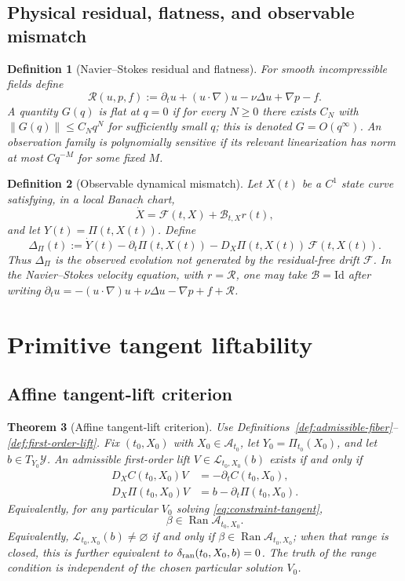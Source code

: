\documentclass[12pt]{article}
\newtheorem{theorem}{Theorem}[section]
\newtheorem{definition}[theorem]{Definition}
\newcommand{\A}{\mathcal A}
\newcommand{\Y}{\mathcal Y}
\newcommand{\Rres}{\mathcal R}
\newcommand{\Ran}{\operatorname{Ran}}
\newcommand{\Id}{\mathrm{Id}}
\newcommand{\Comp}{\mathscr A}
\begin{document}
\subsection{Physical residual, flatness, and observable mismatch}
\begin{definition}[Navier--Stokes residual and flatness]\label{def:residual-flatness}
For smooth incompressible fields define
\[
\Rres(u,p,f)
:=\partial_tu+(u\cdot\nabla)u-\nu\Delta u+\nabla p-f.
\]
A quantity $G(q)$ is \emph{flat at $q=0$} if for every $N\ge0$ there exists $C_N$ with $\|G(q)\|\le C_Nq^N$ for sufficiently small $q$; this is denoted $G=O(q^\infty)$. An observation family is \emph{polynomially sensitive} if its relevant linearization has norm at most $Cq^{-M}$ for some fixed $M$.
\end{definition}

\begin{definition}[Observable dynamical mismatch]\label{def:dyn-mismatch}
Let $X(t)$ be a $C^1$ state curve satisfying, in a local Banach chart,
\[
\dot X=\mathcal F(t,X)+\mathcal B_{t,X}r(t),
\]
and let $Y(t)=\Pi(t,X(t))$. Define
\[
\Delta_\Pi(t)
:=\dot Y(t)-\partial_t\Pi(t,X(t))-D_X\Pi(t,X(t))\,\mathcal F(t,X(t)).
\]
Thus $\Delta_\Pi$ is the observed evolution not generated by the residual-free drift $\mathcal F$. In the Navier--Stokes velocity equation, with $r=\Rres$, one may take $\mathcal B=\Id$ after writing $\partial_tu=-(u\cdot\nabla)u+\nu\Delta u-\nabla p+f+\Rres$.
\end{definition}

\section{Primitive tangent liftability}
\subsection{Affine tangent-lift criterion}
\begin{theorem}[Affine tangent-lift criterion]\label{thm:tangentlift}
Use Definitions~\ref{def:admissible-fiber}--\ref{def:first-order-lift}. Fix $(t_0,X_0)$ with $X_0\in\A_{t_0}$, let $Y_0=\Pi_{t_0}(X_0)$, and let $b\in T_{Y_0}\Y$. An admissible first-order lift $V\in\mathscr L_{t_0,X_0}(b)$ exists if and only if
\begin{align}
D_XC(t_0,X_0)V&=-\partial_tC(t_0,X_0),\label{eq:constraint-tangent}\\
D_X\Pi(t_0,X_0)V&=b-\partial_t\Pi(t_0,X_0).\label{eq:obs-tangent}
\end{align}
Equivalently, for any particular $V_0$ solving \eqref{eq:constraint-tangent},
\[
\boxed{\beta\in\Ran\Comp_{t_0,X_0}.}
\]
Equivalently, $\mathscr L_{t_0,X_0}(b)\neq\varnothing$ if and only if $\beta\in\Ran\Comp_{t_0,X_0}$; when that range is closed, this is further equivalent to $\delta_{\rm ran}(t_0,X_0,b)=0$. The truth of the range condition is independent of the chosen particular solution $V_0$.
\end{theorem}
\end{document}
